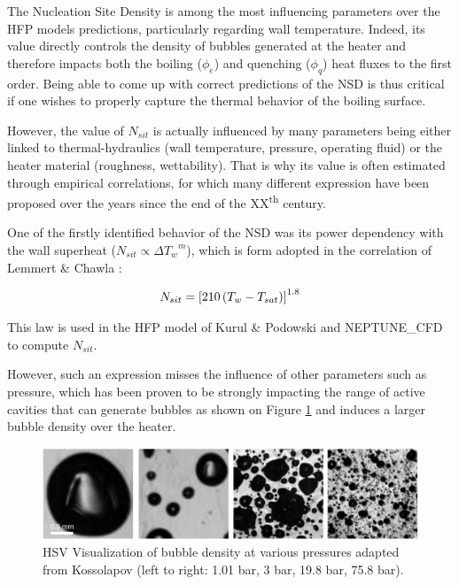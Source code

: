 The Nucleation Site Density is among the most influencing parameters over the HFP models predictions, particularly regarding wall temperature. Indeed, its value directly controls the density of bubbles generated at the heater and therefore impacts both the boiling ($\phi_{e}$) and quenching ($\phi_{q}$) heat fluxes to the first order. Being able to come up with correct predictions of the NSD is thus critical if one wishes to properly capture the thermal behavior of the boiling surface.

However, the value of $N_{sit}$ is actually influenced by many parameters being either linked to thermal-hydraulics (wall temperature, pressure, operating fluid) or the heater material (roughness, wettability). That is why its value is often estimated through empirical correlations, for which many different expression have been proposed over the years since the end of the XX\textsuperscript{th} century.

\npar

One of the firstly identified behavior of the NSD was its power dependency with the wall superheat ($N_{sit} \propto {\Delta T_{w}}^{m}$), which is form adopted in the correlation of Lemmert \& Chawla \cite{Lemmert} : 

\begin{align}
N_{sit}=\left[ 210\left( T_{w}-T_{sat} \right) \right]^{1.8}
\label{eq:nsit_lemmert}
\end{align}

\begin{remark*}{}
This law is used in the HFP model of Kurul \& Podowski and NEPTUNE\_CFD to compute $N_{sit}$.
\end{remark*}

However, such an expression misses the influence of other parameters such as pressure, which has been proven to be strongly impacting the range of active cavities that can generate bubbles as shown on Figure \ref{fig:nsd_P_koss} and induces a larger bubble density over the heater. 

\begin{figure}[h!]
\centering
\includegraphics[width=0.7\linewidth]{img/NSD/nsd_press_koss.png}
\caption{HSV Visualization of bubble density at various pressures adapted from Kossolapov \cite{kossolapov_experimental_2021} (left to right: 1.01 bar, 3 bar, 19.8 bar, 75.8 bar). }
\label{fig:nsd_P_koss}
\end{figure}

